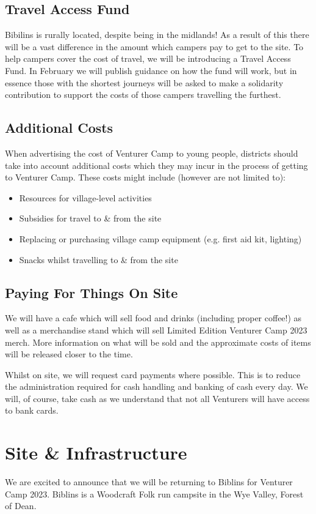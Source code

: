 \documentclass[a4paper, 10pt]{report}
\begin{document}
\section{Travel Access Fund}
Bibilins is rurally located, despite being in the midlands! As a result of this there will be a vast difference in the amount which campers pay to get to the site. To help campers cover the cost of travel, we will be introducing a Travel Access Fund. In February we will publish guidance on how the fund will work, but in essence those with the shortest journeys will be asked to make a solidarity contribution to support the costs of those campers travelling the furthest.
\section{Additional Costs}
When advertising the cost of Venturer Camp to young people, districts should take into account additional costs which they may incur in the process of getting to Venturer Camp. These costs might include (however are not limited to):
\begin{itemize}
    \item Resources for village-level activities
    \item Subsidies for travel to \& from the site
    \item Replacing or purchasing village camp equipment (e.g. first aid kit, lighting)
    \item Snacks whilst travelling to \& from the site
\end{itemize}
\section{Paying For Things On Site}
We will have a cafe which will sell food and drinks (including proper coffee!) as well as a merchandise stand which will sell Limited Edition Venturer Camp 2023 merch. More information on what will be sold and the approximate costs of items will be released closer to the time. 

Whilst on site, we will request card payments where possible. This is to reduce the administration required for cash handling and banking of cash every day. We will, of course, take cash as we understand that not all Venturers will have access to bank cards.

\chapter{Site \& Infrastructure}
We are excited to announce that we will be returning to Biblins for Venturer Camp 2023. Biblins is a Woodcraft Folk run campsite in the Wye Valley, Forest of Dean. 
\end{document}
